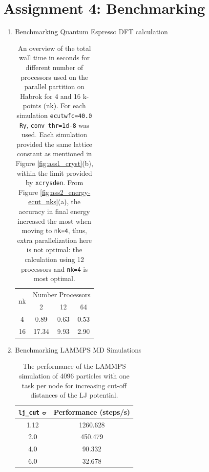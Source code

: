 \documentclass[10pt,a4paper]{labreport}
\begin{document}
\section{Assignment 4: Benchmarking}

\begin{enumerate}
  \item Benchmarking Quantum Espresso DFT calculation
  
  \begin{table}[h]
    \caption{An overview of the total wall time in seconds for different number of processors used on the parallel partition on Habrok for 4 and 16 k-points (nk). For each simulation \texttt{ecutwfc=40.0 Ry}, \texttt{conv\_thr=1d-8} was used. Each simulation provided the same lattice constant as mentioned in Figure \ref{fig:ass1_cryst}(b), within the limit provided by \texttt{xcrysden}. From Figure \ref{fig:ass2_energy-ecut_nks}(a), the accuracy in final energy increased the most when moving to \texttt{nk=4}, thus, extra parallelization here is not optimal: the calculation using 12 processors and \texttt{nk=4} is most optimal. }
    \label{tab:ass4_DFT-benchmark}
    \centering
    \begin{tabular}{c|ccc}
      \hline
      \multirow{2}{*}{nk} & \multicolumn{3}{c}{Number Processors} \\
                          & 2           & 12         & 64         \\ \hline
      4                   & 0.89        & 0.63       & 0.53       \\
      16                  & 17.34       & 9.93       & 2.90       \\ \hline
      \end{tabular}
  \end{table}

\item Benchmarking LAMMPS MD Simulations

\begin{table}[htbp]
  \caption{The performance of the LAMMPS simulation of 4096 particles with one task per node for increasing cut-off distances of the LJ potential.}
  \label{tab:ass4_lammps-lj}
  \centering
  \begin{tabular}{cc} \hline
    \textbf{\texttt{lj\_cut}} $\bm{\sigma}$ & \textbf{Performance (steps/s)}\\
    \hline
    1.12                        & 1260.628                        \\
    2.0                         & 450.479                         \\
    4.0                         & 90.332                          \\
    6.0                         & 32.678                          \\ \hline
    \end{tabular}
\end{table}


\end{enumerate}
\end{document}

